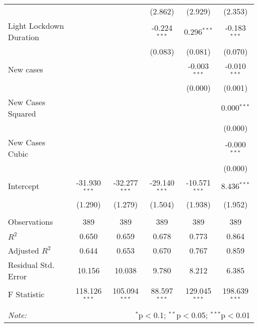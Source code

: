 \begin{tabular}{@{\extracolsep{5pt}}lccccc}
  & & & (2.862) & (2.929) & (2.353) \\
 Light Lockdown Duration & & & -0.224$^{***}$ & 0.296$^{***}$ & -0.183$^{***}$ \\
  & & & (0.083) & (0.081) & (0.070) \\
 New cases & & & & -0.003$^{***}$ & -0.010$^{***}$ \\
  & & & & (0.000) & (0.001) \\
 New Cases Squared & & & & & 0.000$^{***}$ \\
  & & & & & (0.000) \\
 New Cases Cubic & & & & & -0.000$^{***}$ \\
  & & & & & (0.000) \\
 Intercept & -31.930$^{***}$ & -32.277$^{***}$ & -29.140$^{***}$ & -10.571$^{***}$ & 8.436$^{***}$ \\
  & (1.290) & (1.279) & (1.504) & (1.938) & (1.952) \\
\hline \\[-1.8ex]
 Observations & 389 & 389 & 389 & 389 & 389 \\
 $R^2$ & 0.650 & 0.659 & 0.678 & 0.773 & 0.864 \\
 Adjusted $R^2$ & 0.644 & 0.653 & 0.670 & 0.767 & 0.859 \\
 Residual Std. Error & 10.156 & 10.038 & 9.780 & 8.212 & 6.385  \\
 F Statistic & 118.126$^{***}$  & 105.094$^{***}$  & 88.597$^{***}$  & 129.045$^{***}$  & 198.639$^{***}$  \\
\hline
\hline \\[-1.8ex]
\textit{Note:} & \multicolumn{5}{r}{$^{*}$p$<$0.1; $^{**}$p$<$0.05; $^{***}$p$<$0.01} \\
\end{tabular}
